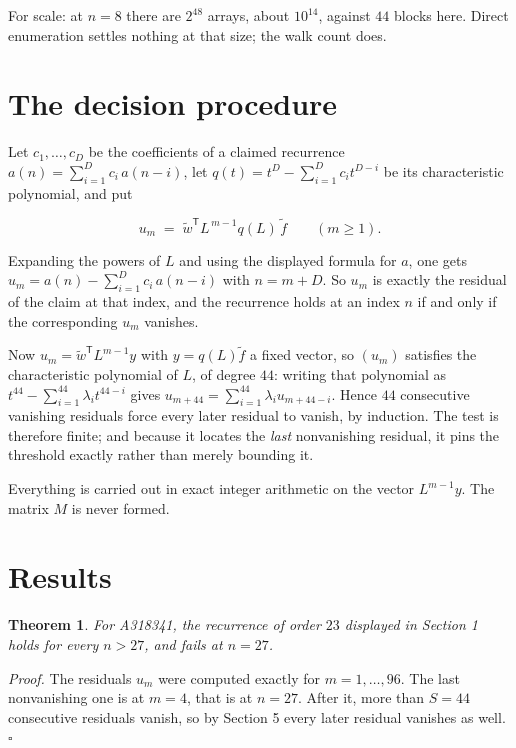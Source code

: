 \documentclass[11pt]{article}
\newtheorem{theorem}{Theorem}
\theoremstyle{definition}
\begin{document}
For scale: at $n = 8$ there are $2^{48}$ arrays, about $10^{14}$, against $44$ blocks here. Direct enumeration settles nothing at that size; the walk count does.

\section{The decision procedure}

Let $c_1,\dots,c_D$ be the coefficients of a claimed recurrence $a(n) = \sum_{i=1}^{D} c_i\,a(n-i)$, let $q(t) = t^{D} - \sum_{i=1}^{D} c_i t^{D-i}$ be its characteristic polynomial, and put

\[u_m \;=\; \tilde w^{\mathsf T} L^{\,m-1} q(L)\,\tilde f \qquad (m \ge 1).\]

Expanding the powers of $L$ and using the displayed formula for $a$, one gets $u_m = a(n) - \sum_{i=1}^{D} c_i\,a(n-i)$ with $n = m + D$. So $u_m$ is exactly the residual of the claim at that index, and the recurrence holds at an index $n$ if and only if the corresponding $u_m$ vanishes.

Now $u_m = \tilde w^{\mathsf T} L^{m-1} y$ with $y = q(L)\tilde f$ a fixed vector, so $(u_m)$ satisfies the characteristic polynomial of $L$, of degree $44$: writing that polynomial as $t^{44} - \sum_{i=1}^{44} \lambda_i t^{44-i}$ gives $u_{m+44} = \sum_{i=1}^{44} \lambda_i u_{m+44-i}$. Hence $44$ consecutive vanishing residuals force every later residual to vanish, by induction. The test is therefore finite; and because it locates the {\itshape last} nonvanishing residual, it pins the threshold exactly rather than merely bounding it.

Everything is carried out in exact integer arithmetic on the vector $L^{m-1}y$. The matrix $M$ is never formed.

\section{Results}

\begin{theorem} For A318341, the recurrence of order $23$ displayed in Section 1 holds for every $n > 27$, and fails at $n = 27$.\end{theorem}

{\itshape Proof.} The residuals $u_m$ were computed exactly for $m = 1,\dots,96$. The last nonvanishing one is at $m = 4$, that is at $n = 27$. After it, more than $S = 44$ consecutive residuals vanish, so by Section 5 every later residual vanishes as well. $\square$
\end{document}
